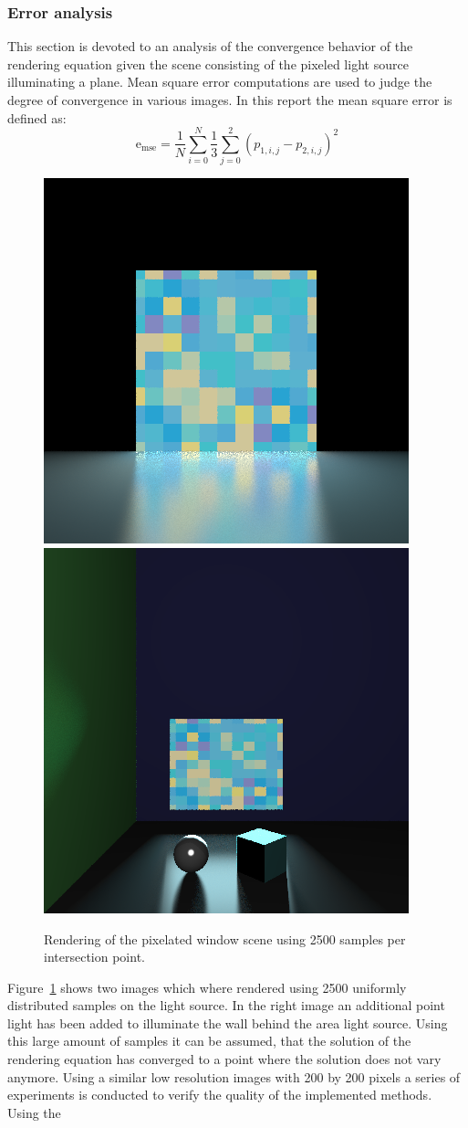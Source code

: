\subsubsection{Error analysis}
This section is devoted to an analysis of the convergence behavior of the rendering equation given the scene consisting of the pixeled light source illuminating a plane. Mean square error computations are used to judge the degree of convergence in various images. In this report the mean square error is defined as:
\begin{equation}
\text{e}_{\text{mse}} = \frac{1}{N} \sum\limits_{i = 0}^{N} \frac{1}{3}\sum\limits_{j = 0}^{2} (p_{1,i,j} - p_{2,i,j} )^2
\end{equation}
\begin{figure}
\centering
\includegraphics[width=0.4\linewidth]{./img/output2500v2}
\includegraphics[width=0.4\linewidth]{./img/exp4}
\caption{Rendering of the pixelated window scene using 2500 samples per intersection point.}
\label{fig:output2500}
\end{figure}
Figure~\ref{fig:output2500} shows two images which where rendered using 2500 uniformly distributed samples on the light source. In the right image an additional point light has been added to illuminate the wall behind the area light source. Using this large amount of samples it can be assumed, that the solution of the rendering equation has converged to a point where the solution does not vary anymore. Using a similar low resolution images with 200 by 200 pixels a series of experiments is conducted to verify the quality of the implemented methods. Using the 
